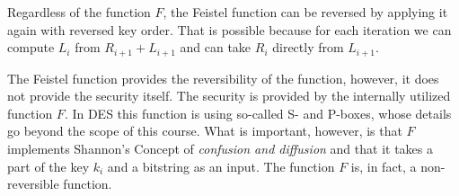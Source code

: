 Regardless of the function $F$, the Feistel function can be reversed by applying it again with reversed key order. That is possible because for each iteration we can compute $L_i$ from $R_{i+1} + L_{i+1}$ and can take $R_i$ directly from $L_{i+1}$.

The Feistel function provides the reversibility of the function, however, it does not provide the security itself. The security is provided by the internally utilized function $F$. In DES this function is using so-called S- and P-boxes, whose details go beyond the scope of this course. What is important, however, is that $F$ implements Shannon's Concept of \textit{confusion and diffusion} and that it takes a part of the key $k_i$ and a bitstring as an input. The function $F$ is, in fact, a non-reversible function.

